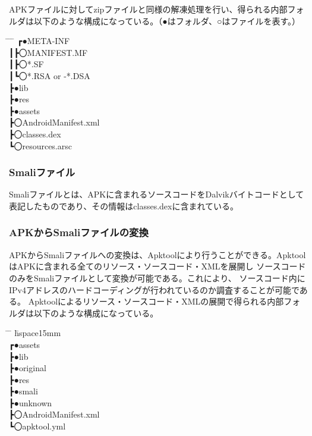 \documentclass[a4j]{jarticle}
\begin{document}
APKファイルに対してzipファイルと同様の解凍処理を行い、得られる内部フォルダは以下のような構成になっている。（●はフォルダ、○はファイルを表す。）
\begin{tabbing}
 \hspace{8mm} \= \hspace{10mm} \= \hspace{12mm} \= \hspace{15mm} \kill
\>┏●META-INF
\\\>┃\>┣〇MANIFEST.MF
\\\>┃\>┣〇*.SF
\\\>┃\>┗〇*.RSA or -*.DSA
\\\>┣●lib
\\\>┣●res
\\\>┣●assets
\\\>┣〇AndroidManifest.xml
\\\>┣〇classes.dex
\\\>┗〇resources.arsc
\end{tabbing}

\subsubsection{Smaliファイル}
Smaliファイルとは、APKに含まれるソースコードをDalvikバイトコードとして表記したものであり、その情報はclasses.dexに含まれている。
\subsubsection{APKからSmaliファイルの変換}
APKからSmaliファイルへの変換は、Apktoolにより行うことができる。ApktoolはAPKに含まれる全てのリソース・ソースコード・XMLを展開し
ソースコードのみをSmaliファイルとして変換が可能である。これにより、
ソースコード内にIPv4アドレスのハードコーディングが行われているのか調査することが可能である。
Apktoolによるリソース・ソースコード・XMLの展開で得られる内部フォルダは以下のような構成になっている。

\begin{tabbing}
	\hspace{8mm} \= \hspace{10mm} \= \hspace{12mm} \= hspace{15mm} \kill
 \\\>┏●assets
 \\\>┣●lib
 \\\>┣●original
 \\\>┣●res
 \\\>┣●smali
 \\\>┣●unknown
 \\\>┣〇AndroidManifest.xml
 \\\>┗〇apktool.yml
 \end{tabbing}
\end{document}
